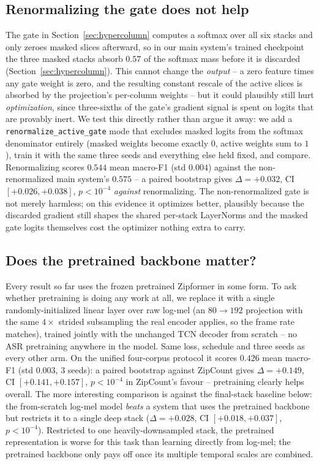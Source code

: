 \documentclass[journal]{IEEEtran}
\newcommand{\sys}{ZipCount}
\begin{document}
\subsection{Renormalizing the gate does not help}
\label{sec:renorm-gate}
The gate in Section~\ref{sec:hypercolumn} computes a softmax over all six
stacks and only zeroes masked slices afterward, so in our main system's
trained checkpoint the three masked stacks absorb $0.57$ of the softmax
mass before it is discarded (Section~\ref{sec:hypercolumn}). This cannot
change the \emph{output} -- a zero feature times any gate weight is zero,
and the resulting constant rescale of the active slices is absorbed by the
projection's per-column weights -- but it could plausibly still hurt
\emph{optimization}, since three-sixths of the gate's gradient signal is
spent on logits that are provably inert. We test this directly rather than
argue it away: we add a \texttt{renormalize\_active\_gate} mode that excludes
masked logits from the softmax denominator entirely (masked weights become
exactly $0$, active weights sum to $1$), train it with the same three
seeds and everything else held fixed, and compare. Renormalizing scores
$0.544$ mean macro-F1 (std $0.004$) against the non-renormalized main
system's $0.575$ -- a paired bootstrap gives $\Delta=+0.032$, CI
$[+0.026,+0.038]$, $p<10^{-4}$ \emph{against} renormalizing. The
non-renormalized gate is not merely harmless; on this evidence it
optimizes better, plausibly because the discarded gradient still shapes
the shared per-stack LayerNorms and the masked gate logits themselves cost
the optimizer nothing extra to carry.

\subsection{Does the pretrained backbone matter?}
\label{sec:logmel-baseline}
Every result so far uses the frozen pretrained Zipformer in some form. To
ask whether pretraining is doing any work at all, we replace it with a
single randomly-initialized linear layer over raw log-mel (an
$80\!\to\!192$ projection with the same $4\times$ strided subsampling the
real encoder applies, so the frame rate matches), trained jointly with the
unchanged TCN decoder from scratch -- no ASR pretraining anywhere in the
model. Same loss, schedule and three seeds as every other arm. On the
unified four-corpus protocol it scores $0.426$ mean macro-F1 (std $0.003$,
3 seeds): a paired bootstrap against \sys{} gives $\Delta=+0.149$, CI
$[+0.141,+0.157]$, $p<10^{-4}$ in \sys{}'s favour -- pretraining clearly
helps overall. The more interesting comparison is against the final-stack
baseline below: the from-scratch log-mel model \emph{beats} a system that
uses the pretrained backbone but restricts it to a single deep stack
($\Delta=+0.028$, CI $[+0.018,+0.037]$, $p<10^{-4}$). Restricted to one
heavily-downsampled stack, the pretrained representation is worse for this
task than learning directly from log-mel; the pretrained backbone only
pays off once its multiple temporal scales are combined.
\end{document}
